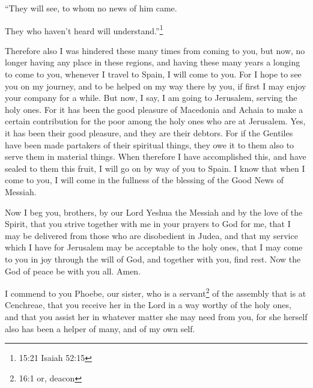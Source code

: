 “They will see, to whom no news of him came.

They who haven’t heard will understand.”\footnote{15:21 Isaiah 52:15}

\myverse{}Therefore also I was hindered these many times from coming to
you,
\myverse{}but now, no longer having any place in these regions, and having these many
years a longing to come to you,
\myverse{}whenever I travel to Spain, I will come to you. For I hope to see you on
my journey, and to be helped on my way there by you, if first I may enjoy your company for a while.
\myverse{}But now, I say, I am going to Jerusalem, serving the holy ones.
\myverse{}For it has been the good pleasure of Macedonia and Achaia to make a certain
contribution for the poor among the holy ones who are at Jerusalem.
\myverse{}Yes, it has been their good pleasure, and they are their debtors. For if
the Gentiles have been made partakers of their spiritual things, they owe it to them also to serve them
in material things.
\myverse{}When therefore I have accomplished this, and have sealed to them this fruit,
I will go on by way of you to Spain.
\myverse{}I know that when I come to you, I will come in the fullness of the blessing
of the Good News of Messiah.

\myverse{}Now I beg you, brothers, by our Lord Yeshua the Messiah and
by the love of the Spirit, that you strive together with me in your prayers to God for me,
\myverse{}that I may be delivered from those who are disobedient in Judea, and that
my service which I have for Jerusalem may be acceptable to the holy ones,
\myverse{}that I may come to you in joy through the will of God, and together with
you, find rest.
\myverse{}Now the God of peace be with you all. Amen.


\mychapter{} \myverse*{}I commend to you Phoebe, our sister, who is a servant\footnote{16:1 or, deacon
} of the assembly that is at Cenchreae,
\myverse{}that you receive her in the Lord in a way worthy of the holy ones, and that
you assist her in whatever matter she may need from you, for she herself also has been a helper of many,
and of my own self.


